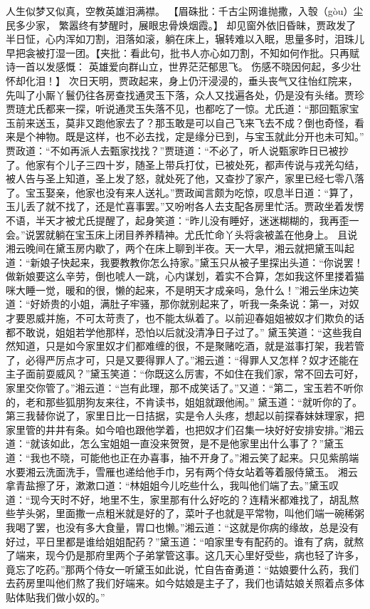 \documentclass[12pt,oneside]{book}
\begin{document}
人生似梦又似真，空教英雄泪满襟。
【眉硃批：千古尘网谁抛撒，入彀（gòu）尘民多少家，
繁嚣终有梦醒时，展眼忠骨焕烟霞。】
却见窗外依旧昏昧，贾政发了半日怔，心内浑如刀割，泪落如滚，躺在床上，辗转难以入眠，思量多时，泪珠儿早把衾被打湿一团。【夹批：看此句，批书人亦心如刀割，不知如何作批。只再赋诗一首以发感慨：
英雄爱向群山立，世界茫茫郁思飞。
伤感不晓因何起，多少壮怀却化泪！】
次日天明，贾政起来，身上仍汗浸浸的，垂头丧气又往怡红院来，先叫了小厮丫鬟仍往各房查找通灵玉下落，众人又找遍各处，仍是没有头绪。贾珍贾琏尤氏都来一探，听说通灵玉失落不见，也都吃了一惊。尤氏道：“那回甄家宝玉前来送玉，莫非又跑他家去了？那玉敢是可以自己飞来飞去不成？倒也奇怪，看来是个神物。既是这样，也不必去找，定是缘分已到，与宝玉就此分开也未可知。”
贾政道：“不如再派人去甄家找找？”贾琏道：“不必了，听人说甄家昨日已被抄了。他家有个儿子三四十岁，随圣上带兵打仗，已被处死，都声传说与戎羌勾结，被人告与圣上知道，圣上发了怒，就处死了他，又查抄了家产，家里已经七零八落了。宝玉娶亲，他家也没有来人送礼。”贾政闻言颇为吃惊，叹息半日道：“算了，玉儿丢了就不找了，还是忙喜事罢。”又吩咐各人去支配各房里忙活。贾政坐着发愣不语，半天才被尤氏提醒了，起身笑道：“昨儿没有睡好，迷迷糊糊的，我再歪一会。”说罢就躺在宝玉床上闭目养养精神。尤氏忙命丫头将衾被盖在他身上。
且说湘云晚间在黛玉房内歇了，两个在床上聊到半夜。天一大早，湘云就把黛玉叫起道：“新娘子快起来，我要教教你怎么持家。”黛玉只从被子里探出头道：“你说罢！做新娘要这么辛劳，倒也唬人一跳，心内谋划，着实不合算，怎如我这怀里搂着猫咪大睡一觉，暖和的很，懒的起来，不是明天才成亲吗，急什么！”湘云坐床边笑道：“好娇贵的小姐，满肚子牢骚，那你就别起来了，听我一条条说：第一，对奴才要恩威并施，不可太苛责了，也不能太纵着了。以前迎春姐姐被奴才们欺负的话都不敢说，姐姐若学他那样，恐怕以后就没清净日子过了。”
黛玉笑道：“这些我自然知道，只是如今家里奴才们都难缠的很，不是聚赌吃酒，就是滋事打架，我若管了，必得严厉点才可，只是又要得罪人了。”湘云道：“得罪人又怎样？奴才还能在主子面前耍威风？”黛玉笑道：“你既这么厉害，不如住在我们家，常不回去可好，家里交你管了。”湘云道：“岂有此理，那不成笑话了。”又道：“第二，宝玉若不听你的，老和那些狐朋狗友来往，不肯读书，姐姐就跟他闹。”
黛玉道：“就听你的了。第三我替你说了，家里日比一日拮据，实是令人头疼，想起以前探春妹妹理家，把家里管的井井有条。如今咱也跟他学着，也把奴才们召集一块好好安排安排。”湘云道：“就该如此，怎么宝姐姐一直没来贺贺，是不是他家里出什么事了？”黛玉道：“我也不晓，可能他也正在办喜事，抽不开身了。”湘云笑了起来。只见紫鹃端水要湘云洗面洗手，雪雁也递给他手巾，另有两个侍女站着等着服侍黛玉。
湘云拿青盐擦了牙，漱漱口道：“林姐姐今儿吃些什么，我叫他们端了去。”黛玉叹道：“现今天时不好，地里不生，家里那有什么好吃的？连精米都难找了，胡乱熬些芋头粥，里面撒一点粗米就是好的了，菜叶子也就是平常物，叫他们端一碗稀粥我喝了罢，也没有多大食量，胃口也懒。”湘云道：“这就是你病的缘故，总是没有好过，平日里都是谁给姐姐配药？”黛玉道：“咱家里专有配药的。谁有了病，就熬了端来，现今仍是那府里两个子弟掌管这事。这几天心里好受些，病也轻了许多，竟忘了吃药。”那两个侍女一听黛玉如此说，忙自告奋勇道：“姑娘要什么药，我们去药房里叫他们熬了我们好端来。如今姑娘是主子了，我们也请姑娘关照着点多体贴体贴我们做小奴的。”
\end{document}

